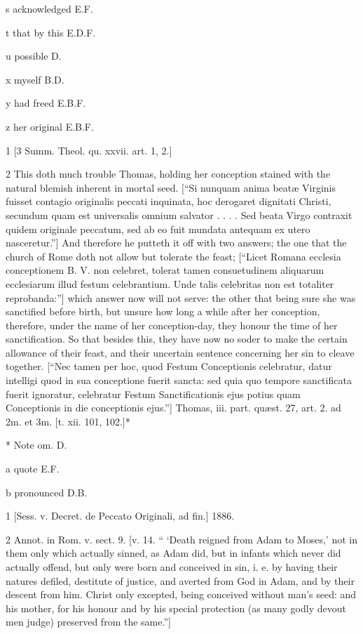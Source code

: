 s
acknowledged E.F.

t
that by this E.D.F.

u
possible D.

x
myself B.D.

y
had freed E.B.F.

z
her original E.B.F.

1
[3 Summ. Theol. qu. xxvii. art. 1, 2.]

2
This doth much trouble Thomas, holding her conception stained with the natural blemish inherent in mortal seed. [“Si nunquam anima beatæ Virginis fuisset contagio originalis peccati inquinata, hoc derogaret dignitati Christi, secundum quam est universalis omnium salvator . . . . Sed beata Virgo contraxit quidem originale peccatum, sed ab eo fuit mundata antequam ex utero nasceretur.”] And therefore he putteth it off with two answers; the one that the church of Rome doth not allow but tolerate the feast; [“Licet Romana ecclesia conceptionem B. V. non celebret, tolerat tamen consuetudinem aliquarum ecclesiarum illud festum celebrantium. Unde talis celebritas non est totaliter reprobanda:”] which answer now will not serve: the other that being sure she was sanctified before birth, but unsure how long a while after her conception, therefore, under the name of her conception-day, they honour the time of her sanctification. So that besides this, they have now no soder to make the certain allowance of their feast, and their uncertain sentence concerning her sin to cleave together. [“Nec tamen per hoc, quod Festum Conceptionis celebratur, datur intelligi quod in sua conceptione fuerit sancta: sed quia quo tempore sanctificata fuerit ignoratur, celebratur Festum Sanctificationis ejus potius quam Conceptionis in die conceptionis ejus.”] Thomas, iii. part. quæst. 27, art. 2. ad 2m. et 3m. [t. xii. 101, 102.]*

*
Note om. D.

a
quote E.F.

b
pronounced D.B.

1
[Sess. v. Decret. de Peccato Originali, ad fin.] 1886.

2
Annot. in Rom. v. sect. 9. [v. 14. “ ‘Death reigned from Adam to Moses,’ not in them only which actually sinned, as Adam did, but in infants which never did actually offend, but only were born and conceived in sin, i. e. by having their natures defiled, destitute of justice, and averted from God in Adam, and by their descent from him. Christ only excepted, being conceived without man’s seed: and his mother, for his honour and by his special protection (as many godly devout men judge) preserved from the same.”]

